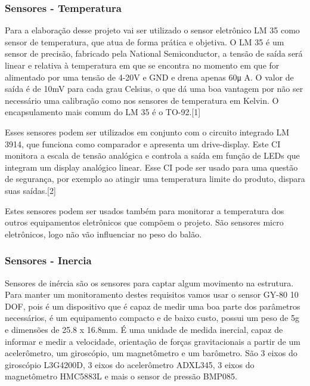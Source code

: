 \subsubsection{Sensores - Temperatura}
\indent
\par
Para a elaboração desse projeto vai ser utilizado o sensor eletrônico LM 35 como sensor de temperatura, que atua de forma prática e objetiva. O LM 35 é um sensor de precisão, fabricado pela National Semiconductor, a tensão de saída será linear e relativa à temperatura em que se encontra no momento em que for alimentado por uma tensão de 4-20V e GND e drena apenas 60μ A. O valor de saída é de 10mV para cada grau Celsius, o que dá uma boa vantagem por não ser necessário uma calibração como nos sensores de temperatura em Kelvin. O encapsulamento mais comum do LM 35 é o TO-92.[1]
\indent
\\\par
Esses sensores podem ser utilizados em conjunto com o circuito integrado LM 3914, que funciona como comparador e apresenta um drive-display. Este CI monitora a escala de tensão analógica e controla a saída em função de LEDs que integram um display analógico linear. Esse CI pode ser usado para uma questão de segurança, por exemplo ao atingir uma temperatura limite do produto, dispara suas saídas.[2]
\indent
\\\par
Estes sensores podem ser usados também para monitorar a temperatura dos outros equipamentos eletrônicos que compõem o projeto. São sensores micro eletrônicos, logo não vão influenciar no peso do balão.

\subsubsection{Sensores - Inercia}
\indent
\par
Sensores de inércia são os sensores para captar algum movimento na estrutura. Para manter um monitoramento destes requisitos vamos usar o sensor GY-80 10 DOF, pois é um dispositivo que é capaz de medir uma boa parte dos parâmetros necessários, é um equipamento compacto e de baixo custo, possui um peso de 5g e dimensões de 25.8 x 16.8mm. É uma unidade de medida inercial, capaz de informar e medir a velocidade, orientação de forças gravitacionais a partir de um acelerômetro, um giroscópio, um magnetômetro e um barômetro. São 3 eixos do giroscópio L3G4200D, 3 eixos do acelerômetro ADXL345, 3 eixos do magnetômetro HMC5883L e mais o sensor de pressão BMP085.

